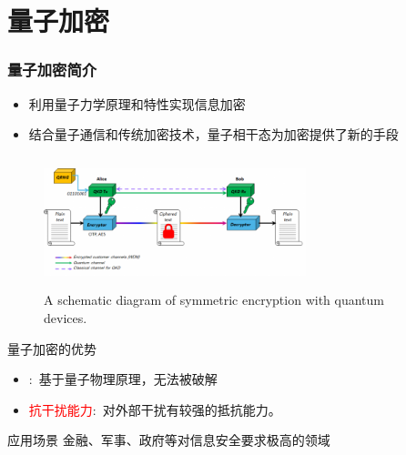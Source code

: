 \section{量子加密}
\begin{frame}
    \frametitle{量子加密简介}
    \begin{itemize}
        \item 利用量子力学原理和特性实现信息加密
        \item 结合量子通信和传统加密技术，量子相干态为加密提供了新的手段
    \end{itemize}
    \begin{figure}
        \centering
                \includegraphics[height=1.5in, width=3.0in, viewport=0 0 768 314,clip]{Figures/Symmetric_encryption-with-quantum_devices.png}
		\caption{\tiny{\textrm{A schematic diagram of symmetric encryption with quantum devices.}}}
		\label{Fig:Symmetric_encryption-with-quantum_devices}
    \end{figure}
    \vskip -10pt

量子加密的优势
    \begin{itemize}
	    \item {}:~基于量子物理原理，无法被破解\\
		    {\fontsize{7.5pt}{5.2pt}\selectfont{\textcolor{blue}{量子相干态的稳定性保证了加密的安全性}}}
	    \item \textcolor{red}{抗干扰能力}:~对外部干扰有较强的抵抗能力。
    \end{itemize}
    \begin{exampleblock}{应用场景}
        金融、军事、政府等对信息安全要求极高的领域
    \end{exampleblock}
\end{frame}

